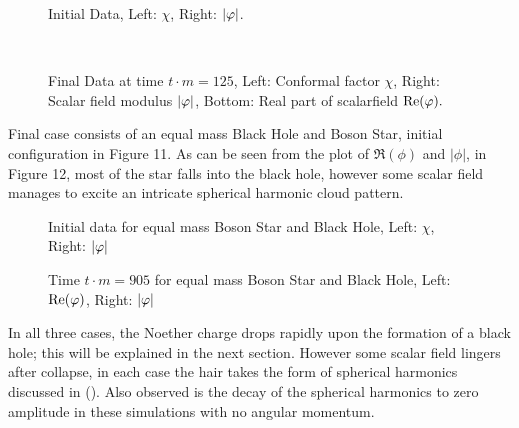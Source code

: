   \begin{figure}[h!]
  \caption{Initial Data, Left: $\chi$, Right: $|\varphi|$.}
  \centering
  \hfill
\end{figure}
  \begin{figure}[h!]
  \caption{Final Data at time $t\cdot m = 125$, Left: Conformal factor $\chi$, Right: Scalar field modulus $|\varphi|$, Bottom: Real part of scalarfield $\mathrm{Re}(\varphi).$}
  \centering
  \hfill
  \\
\end{figure}
Final case consists of an equal mass Black Hole and Boson Star, initial configuration in Figure 11. As can be seen from the plot of $\Re(\phi)$ and $|\phi|$, in Figure 12, most of the star falls into the black hole, however some scalar field manages to excite an intricate spherical harmonic cloud pattern.
  \begin{figure}[h!]
  \caption{Initial data for equal mass Boson Star and Black Hole, Left: $\chi$, Right: $|\varphi|$}
  \centering
  \hfill
\end{figure}
  \begin{figure}[h!]
  \caption{Time $t\cdot m=905$ for equal mass Boson Star and Black Hole, Left: $\Re(\varphi)$, Right: $|\varphi|$}
  \centering
  \hfill
\end{figure}

In all three cases, the Noether charge drops rapidly upon the formation of a black hole; this will be explained in the next section. However some scalar field lingers after collapse, in each case the hair takes the form of spherical harmonics discussed in (). Also observed is the decay of the spherical harmonics to zero amplitude in these simulations with no angular momentum. 
 
